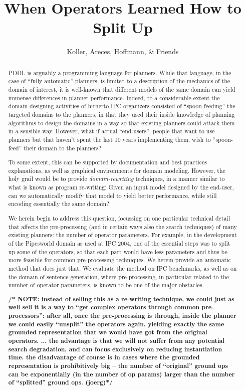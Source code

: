 \documentclass{llncs}
\title{When Operators Learned How to Split Up}
\author{Koller, Areces, Hoffmann, \& Friends}
\institute{I'm sure they're working somewhere \dots}
\newcommand{\joerg}[1]{\textbf{\color{CommentColor} /* #1  (joerg)*/}}
\begin{document}
\maketitle


\begin{abstract}
PDDL is arguably a programming language for planners. While that
language, in the case of ``fully automatic'' planners, is limited to a
description of the mechanics of the domain of interest, it is
well-known that different models of the same domain can yield immense
differences in planner performance. Indeed, to a considerable extent
the domain-designing activities of hitherto IPC organizers consisted
of ``spoon-feeding'' the targeted domains to the planners, in that
they used their inside knowledge of planning algorithms to design the
domains in a way so that existing planners could attack them in a
sensible way. However, what if actual ``end-users'', people that want
to use planners but that haven't spent the last 10 years implementing
them, wish to ``spoon-feed'' their domain to the planners?

To some extent, this can be supported by documentation and best
practices explanations, as well as graphical environments for domain
modeling. However, the holy grail would be to provide
\emph{domain-rewriting} techniques, in a manner similar to what is
known as program re-writing: Given an input model designed by the
end-user, can we automatically modify that model to yield better
performance, while still encoding essentially the same domain?

We herein begin to address this question, focussing on one particular
technical detail that affects the pre-processing (and in certain ways
also the search techniques) of many existing planners: the number of
operator parameters. For example, in the development of the Pipesworld
domain as used at IPC 2004, one of the essential steps was to split up
some of the operators, so that each part would have less parameters
and thus be more feasible for common pre-processing techniques. We
herein provide an automatic method that does just that. We evaluate
the method on IPC benchmarks, as well as on the domain of sentence
generation, where pre-processing, in particular related to the number
of operator parameters, is known to be one of the major obstacles.

\joerg{NOTE: instead of selling this as a re-writing technique, we
  could just as well sell it is a way to ``get complex operators
  through common pre-processors'': after all, once the pre-processing
  is through, inside the planner we could easily ``unsplit'' the
  operators again, yielding exactly the same grounded representation
  that we would have got from the original operators. ... the
  advantage is that we will not suffer from any potential search
  degradation, and can focus exclusively on reducing instantiation
  time. the disadvantage of course is in cases where the grounded
  representation is prohibitively big -- the number of ``original''
  ground ops can be exponentially (in the number of op params) larger
  than the number of ``splitted'' ground ops.}
\end{abstract}
\end{document}
